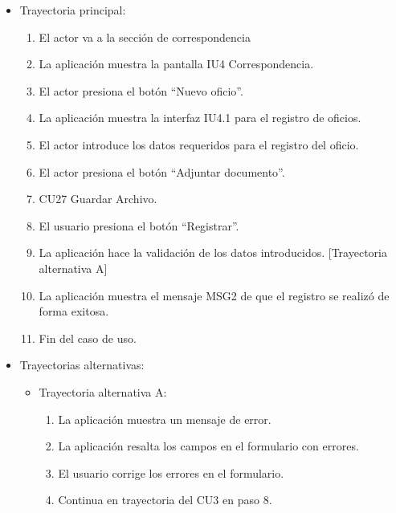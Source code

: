 \begin{itemize}
	\item Trayectoria principal:
	\begin{enumerate}
		\item El actor va a la sección de correspondencia 
		\item La aplicación muestra la pantalla IU4 Correspondencia.
		\item El actor presiona el botón “Nuevo oficio”.
		\item La aplicación muestra la interfaz IU4.1 para el registro de oficios.
		\item El actor introduce los datos requeridos para el registro del oficio.
		\item El actor presiona el botón “Adjuntar documento”.
		\item CU27 Guardar Archivo.
		\item El usuario presiona el botón “Registrar”. 
		\item La aplicación hace la validación de los datos introducidos. [Trayectoria alternativa A] 
		\item La aplicación muestra el mensaje MSG2 de que el registro se realizó de forma exitosa.
		\item Fin del caso de uso.
	\end{enumerate}
	
	\item Trayectorias alternativas:
	\begin{itemize}
		\item Trayectoria alternativa A:
			\begin{enumerate}
				\item La aplicación muestra un mensaje de error.
				\item La aplicación resalta los campos en el formulario con errores.
				\item El usuario corrige los errores en el formulario.
				\item Continua en trayectoria del CU3 en paso 8.
			\end{enumerate}
	\end{itemize}
\end{itemize}
